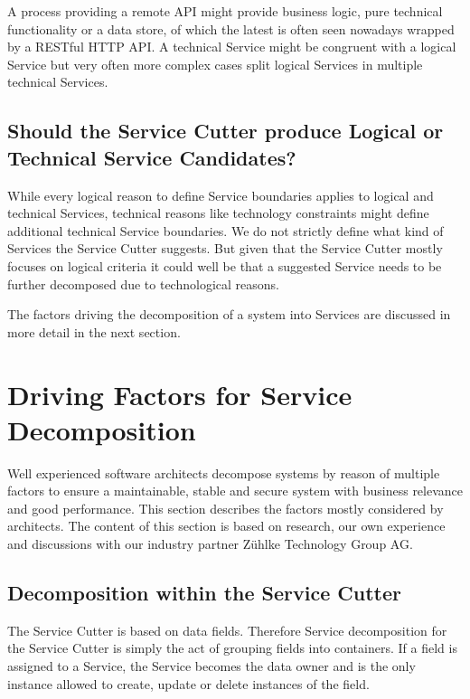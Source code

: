 A process providing a remote API might provide business logic, pure technical functionality or a data store, of which the latest is often seen nowadays wrapped by a RESTful HTTP API. A technical Service might be congruent with a logical Service but very often more complex cases split logical Services in multiple technical Services. 

\subsection{Should the Service Cutter produce Logical or Technical Service Candidates?}

While every logical reason to define Service boundaries applies to logical and technical Services, technical reasons like technology constraints might define additional technical Service boundaries. We do not strictly define what kind of Services the Service Cutter suggests. But given that the Service Cutter mostly focuses on logical criteria it could well be that a suggested Service needs to be further decomposed due to technological reasons.

The factors driving the decomposition of a system into Services are discussed in more detail in the next section.

\section{Driving Factors for Service Decomposition}

Well experienced software architects decompose systems by reason of multiple factors to ensure a maintainable, stable and secure system with business relevance and good performance. This section describes the factors mostly considered by architects. The content of this section is based on research, our own experience and discussions with our industry partner Zühlke Technology Group AG. 

\subsection{Decomposition within the Service Cutter}

The Service Cutter is based on data fields. Therefore Service decomposition for the Service Cutter is simply the act of grouping fields into containers. If a field is assigned to a Service, the Service becomes the data owner and is the only instance allowed to create, update or delete instances of the field.



